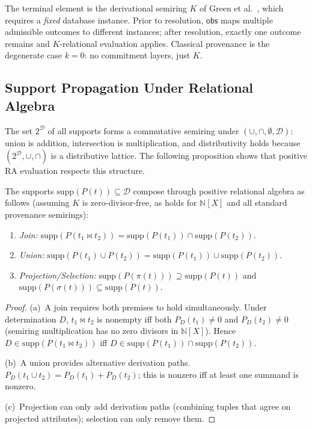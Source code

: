\documentclass[acmsmall,review,anonymous]{acmart}
\theoremstyle{remark}
\numberwithin{definition}{section}
\numberwithin{theorem}{section}
\numberwithin{lemma}{section}
\numberwithin{corollary}{section}
\numberwithin{remark}{section}
\numberwithin{example}{section}
\numberwithin{observation}{section}
\numberwithin{assumption}{section}
\begin{document}
The terminal element is the derivational semiring $K$ of Green et
al.~\cite{green2007provenance}, which requires a \emph{fixed} database
instance.
Prior to resolution, $\mathsf{obs}$ maps multiple admissible outcomes
to different instances; after resolution, exactly one outcome remains
and $K$-relational evaluation applies.
Classical provenance is the degenerate case $k = 0$: no commitment
layers, just $K$.

\subsection{Support Propagation Under Relational Algebra}

The set $2^{\mathcal{D}}$ of all supports forms a commutative semiring
under $(\cup, \cap, \emptyset, \mathcal{D})$: union is addition,
intersection is multiplication, and distributivity holds because
$(2^{\mathcal{D}}, \cup, \cap)$ is a distributive lattice.
The following proposition shows that positive RA evaluation respects
this structure.

\begin{proposition}
  The supports $\mathrm{supp}(P(t)) \subseteq \mathcal{D}$ compose
  through positive relational algebra as follows
  (assuming $K$ is zero-divisor-free, as holds for $\mathbb{N}[X]$
  and all standard provenance semirings):
  \begin{enumerate}[nosep,label=(\alph*)]
    \item \emph{Join:}
          $\mathrm{supp}(P(t_1 \bowtie t_2))
          = \mathrm{supp}(P(t_1)) \cap \mathrm{supp}(P(t_2))$.
    \item \emph{Union:}
          $\mathrm{supp}(P(t_1) \cup P(t_2))
          = \mathrm{supp}(P(t_1)) \cup \mathrm{supp}(P(t_2))$.
    \item \emph{Projection/Selection:}
          $\mathrm{supp}(P(\pi(t))) \supseteq \mathrm{supp}(P(t))$
          and
          $\mathrm{supp}(P(\sigma(t))) \subseteq \mathrm{supp}(P(t))$.
  \end{enumerate}
\end{proposition}
\begin{proof}
  (a)~A join requires both premises to hold simultaneously.
  Under determination $D$, $t_1 \bowtie t_2$ is nonempty iff both
  $P_D(t_1) \neq 0$ and $P_D(t_2) \neq 0$ (semiring multiplication
  has no zero divisors in $\mathbb{N}[X]$).
  Hence $D \in \mathrm{supp}(P(t_1 \bowtie t_2))$ iff
  $D \in \mathrm{supp}(P(t_1)) \cap \mathrm{supp}(P(t_2))$.

  (b)~A union provides alternative derivation paths.
  $P_D(t_1 \cup t_2) = P_D(t_1) + P_D(t_2)$; this is nonzero iff at
  least one summand is nonzero.

  (c)~Projection can only add derivation paths (combining tuples that
  agree on projected attributes); selection can only remove them.
\end{proof}
\end{document}
